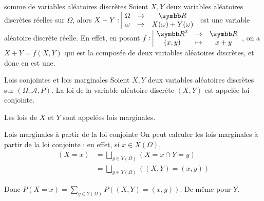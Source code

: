 \begin{corollaire}{somme de variables aléatoires discrètes}{}
    Soient $X, Y$ deux variables aléatoires discrètes réelles sur $\Omega$, alors 
    $\fonction{X + Y}{\Omega}{\R}{\omega}{X(\omega) + Y(\omega)}$ est une variable aléatoire discrète 
    réelle. En effet, en posant $\fonction{f}{\R^2}{\R}{(x, y)}{x + y}$, on a $X + Y = f(X, Y)$ qui est 
    la composée de deux variables aléatoires discrètes, et donc en est une. 
\end{corollaire}

\begin{definition}{Lois conjointes et lois marginales}{}
    Soient $X, Y$ deux variables aléatoires discrètes sur $(\Omega, \mathcal A, P)$.
    La loi de la variable aléatoire discrète $(X, Y)$ est appelée loi conjointe. 

    Les lois de $X$ et $Y$ sont appelées lois marginales.
\end{definition}

\begin{proposition}{Lois marginales à partir de la loi conjointe}{}
    On peut calculer les lois marginales à partir de la loi conjointe : en effet, si 
    $x \in X(\Omega)$, 
    \begin{align}
        (X = x) & = \bigsqcup_{y \in Y(\Omega)} (X = x \cap Y = y) \\
        & = \bigsqcup_{y \in Y(\Omega)} ((X, Y) = (x, y))
    \end{align}

    Donc $\displaystyle P(X = x) = \sum_{y \in Y(\Omega)} P((X, Y) = (x, y))$.
    De même pour $Y$. 
\end{proposition}

